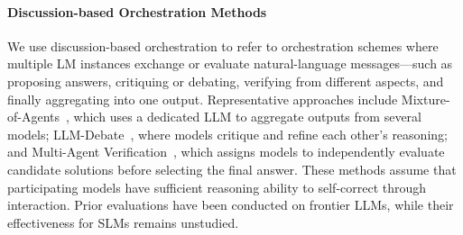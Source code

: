 


\paragraph{Discussion-based Orchestration Methods} We use discussion-based orchestration to refer to orchestration schemes where multiple LM instances exchange or evaluate natural-language messages—such as proposing answers, critiquing or debating, verifying from different aspects, and finally aggregating into one output. Representative approaches include Mixture-of-Agents~\citep{wang2024mixtureofagentsenhanceslargelanguage}, which uses a dedicated LLM to aggregate outputs from several models; LLM-Debate~\citep{du2023improvingfactualityreasoninglanguage}, where models critique and refine each other’s reasoning; and Multi-Agent Verification~\citep{lifshitz2025multiagentverificationscalingtesttime}, which assigns models to independently evaluate candidate solutions before selecting the final answer. These methods assume that participating models have sufficient reasoning ability to self-correct through interaction. Prior evaluations have been conducted on frontier LLMs, while their effectiveness for SLMs remains unstudied.

